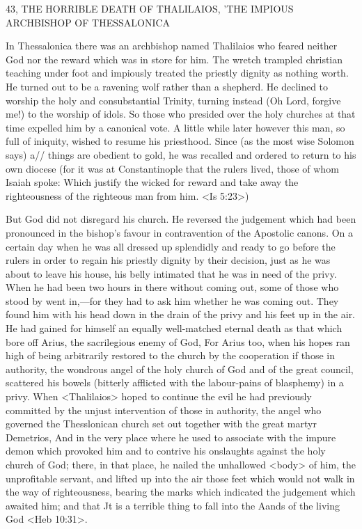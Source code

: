 43, THE HORRIBLE DEATH OF THALILAIOS,
'THE IMPIOUS ARCHBISHOP OF THESSALONICA

In Thessalonica there was an archbishop named Thalilaios who
feared neither God nor the reward which was in store for him.
The
wretch trampled christian teaching under foot and impiously treated
the priestly dignity as nothing worth.
He turned out to be a
ravening wolf rather than a shepherd.
He declined to worship the
holy and consubstantial Trinity, turning instead (Oh Lord, forgive
me!) to the worship of idols.
So those who presided over the holy
churches at that time expelled him by a canonical vote.
A little while
later however this man, so full of iniquity, wished to resume his
priesthood.
Since (as the most wise Solomon says) a// things are
obedient to gold, he was recalled and ordered to return to his own
diocese (for it was at Constantinople that the rulers lived, those of
whom Isaiah spoke: Which justify the wicked for reward and take
away the righteousness of the righteous man from him.
<Is 5:23>)

But God did not disregard his church.
He reversed the judgement
which had been pronounced in the bishop's favour in contravention
of the Apostolic canons.
On a certain day when he was all dressed
up splendidly and ready to go before the rulers in order to regain
his priestly dignity by their decision, just as he was about to leave
his house, his belly intimated that he was in need of the privy.
When he had been two hours in there without coming out, some of
those who stood by went in,—for they had to ask him whether he
was coming out.
They found him with his head down in the drain
of the privy and his feet up in the air.
He had gained for himself an
equally well-matched eternal death as that which bore off Arius, the
sacrilegious enemy of God, For Arius too, when his hopes ran high
of being arbitrarily restored to the church by the cooperation if
those in authority, the wondrous angel of the holy church of God
and of the great council, scattered his bowels (bitterly afflicted with
the labour-pains of blasphemy) in a privy.
When <Thalilaios>
hoped to continue the evil he had previously committed by the
unjust intervention of those in authority, the angel who governed
the Thesslonican church set out together with the great martyr
Demetrios, And in the very place where he used to associate with
the impure demon which provoked him and to contrive his
onslaughts against the holy church of God; there, in that place, he
nailed the unhallowed <body> of him, the unprofitable servant, and
lifted up into the air those feet which would not walk in the way of
righteousness, bearing the marks which indicated the judgement
which awaited him; and that Jt is a terrible thing to fall into the
Aands of the living God <Heb 10:31>.


